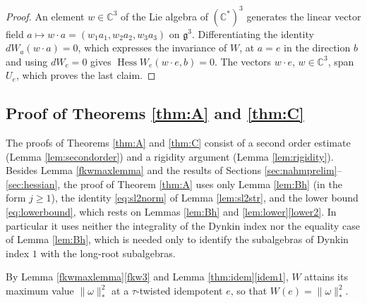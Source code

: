 \documentclass[leqno,10pt]{amsart}
\theoremstyle{definition}
\numberwithin{equation}{section}
\newcommand{\om}{\omega}
\newcommand{\hess}{\operatorname{Hess}}
\newcommand{\g}{\mathfrak{g}}
\newcommand{\com}{\mathbb C}
\newcommand{\comass}[1]{\lVert #1\rVert_{\ast}}%
\newcommand{\Usp}{U}
\begin{document}
\begin{proof}
An element $w \in \com^{3}$ of the Lie algebra of $(\com^{\ast})^{3}$ generates the linear vector field $a \mapsto w \cdot a = (w_{1}a_{1}, w_{2}a_{2}, w_{3}a_{3})$ on $\g^{3}$. Differentiating the identity $dW_{a}(w \cdot a) = 0$, which expresses the invariance of $W$, at $a = e$ in the direction $b$ and using $dW_{e} = 0$ gives $\hess W_{e}(w \cdot e, b) = 0$. The vectors $w \cdot e$, $w \in \com^{3}$, span $\Usp_{e}$, which proves the last claim.
\end{proof}

\subsection{Proof of Theorems \ref{thm:A} and \ref{thm:C}}\label{sec:sharp}
The proofs of Theorems \ref{thm:A} and \ref{thm:C} consist of a second order estimate (Lemma \ref{lem:secondorder}) and a rigidity argument (Lemma \ref{lem:rigidity}). Besides Lemma \ref{fkwmaxlemma} and the results of Sections \ref{sec:nahmprelim}--\ref{sec:hessian}, the proof of Theorem \ref{thm:A} uses only Lemma \ref{lem:Bh} (in the form $j \geq 1$), the identity \eqref{eq:sl2norm} of Lemma \ref{lem:sl2str}, and the lower bound \eqref{eq:lowerbound}, which rests on Lemmas \ref{lem:Bh} and \ref{lem:lower}\ref{lower2}. In particular it uses neither the integrality of the Dynkin index nor the equality case of Lemma \ref{lem:Bh}, which is needed only to identify the subalgebras of Dynkin index $1$ with the long-root subalgebras.

By Lemma \ref{fkwmaxlemma}\ref{fkw3} and Lemma \ref{thm:idem}\ref{idem1}, $W$ attains its maximum value $\comass{\om}^{2}$ at a $\tau$-twisted idempotent $e$, so that $W(e) = \comass{\om}^{2}$.
\end{document}
